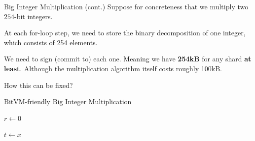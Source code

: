 \documentclass{zkdl-presentation-template}
\begin{document}
    \begin{frame}{Big Integer Multiplication (cont.)}
        Suppose for concreteness that we multiply two $254$-bit integers. \pause

        At each for-loop step, we need to store the binary decomposition of one integer, which consists of 254 elements. \pause

        We need to sign (commit to) each one. Meaning we have \textbf{254kB} for any shard \textbf{at least}. Although the multiplication algorithm itself costs roughly 100kB. \pause

        How this can be fixed?
    \end{frame}

    \begin{frame}{BitVM-friendly Big Integer Multiplication}
        \small
        \begin{algorithm}[H]
  \caption{BitVM-friendly double-and-add method}\label{alg:double_and_add}
  
  $r \gets 0$

  $t \gets x$

  

  \label{alg:double_and_add_bitvm_friendly}
\end{algorithm}
    \end{frame}
\end{document}
